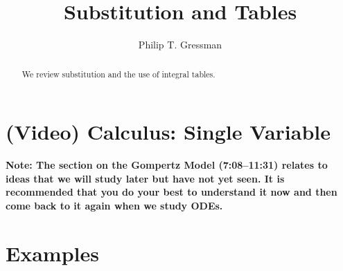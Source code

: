 \documentclass{ximera}
\title{Substitution and Tables}
\author{Philip T. Gressman}
\begin{document}
\begin{abstract}
We review substitution and the use of integral tables.
\end{abstract}
\maketitle


\section*{(Video) Calculus: Single Variable}
\textbf{Note: The section on the Gompertz Model (7:08--11:31) relates to ideas that we will study later but have not yet seen. It is recommended that you do your best to understand it now and then come back to it again when we study ODEs.}

\section*{Examples}
\end{document}

